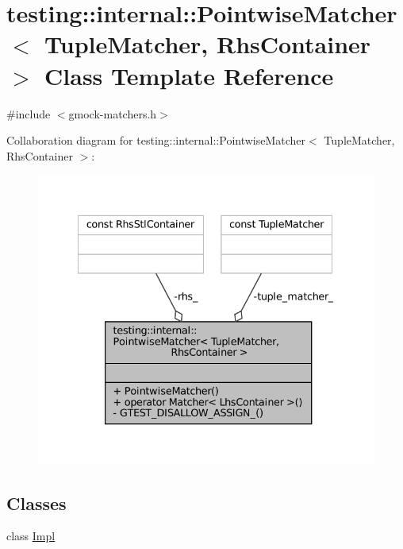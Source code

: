 \hypertarget{classtesting_1_1internal_1_1PointwiseMatcher}{}\section{testing\+:\+:internal\+:\+:Pointwise\+Matcher$<$ Tuple\+Matcher, Rhs\+Container $>$ Class Template Reference}
\label{classtesting_1_1internal_1_1PointwiseMatcher}


{\ttfamily \#include $<$gmock-\/matchers.\+h$>$}



Collaboration diagram for testing\+:\+:internal\+:\+:Pointwise\+Matcher$<$ Tuple\+Matcher, Rhs\+Container $>$\+:
\nopagebreak
\begin{figure}[H]
\begin{center}
\leavevmode
\includegraphics[width=334pt]{classtesting_1_1internal_1_1PointwiseMatcher__coll__graph}
\end{center}
\end{figure}
\subsection*{Classes}
\begin{DoxyCompactItemize}
\item 
class \hyperlink{classtesting_1_1internal_1_1PointwiseMatcher_1_1Impl}{Impl}
\end{DoxyCompactItemize}
